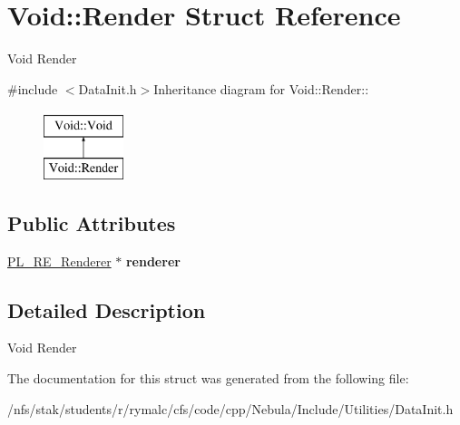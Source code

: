 \hypertarget{structVoid_1_1Render}{
\section{Void::Render Struct Reference}
\label{structVoid_1_1Render}
}


Void Render  


{\ttfamily \#include $<$DataInit.h$>$}Inheritance diagram for Void::Render::\begin{figure}[H]
\begin{center}
\leavevmode
\includegraphics[height=2cm]{structVoid_1_1Render}
\end{center}
\end{figure}
\subsection*{Public Attributes}
\begin{DoxyCompactItemize}
\item 
\hypertarget{structVoid_1_1Render_a76fce5d99d06e3bca52177be57590f46}{
\hyperlink{classPlatform_1_1Renderer_1_1Renderer}{PL\_\-RE\_\-Renderer} $\ast$ {\bfseries renderer}}
\label{structVoid_1_1Render_a76fce5d99d06e3bca52177be57590f46}

\end{DoxyCompactItemize}


\subsection{Detailed Description}
Void Render 

The documentation for this struct was generated from the following file:\begin{DoxyCompactItemize}
\item 
/nfs/stak/students/r/rymalc/cfs/code/cpp/Nebula/Include/Utilities/DataInit.h\end{DoxyCompactItemize}
